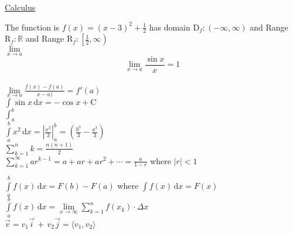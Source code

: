 \documentclass[11pt, letterpaper]{article}
\author{Anish Sachdeva}
\begin{document}
\begin{center}
\underline{Calculus}
\end{center}
The function is $f(x) = (x-3)^2 + \frac{1}{2}$ has domain 
$\mathrm{D}_f : (-\infty, \infty)$ 
and Range $\mathrm{R}_f : \mathbb{R}$
and Range $\mathrm{R}_f : \left[\frac{1}{2}, \infty\right)$\\

$\lim \limits_{x \rightarrow a}$\\

$$\lim \limits_{x \to a} \frac{\sin{x}}{x} = 1$$\\

$\lim \limits_{x \to 	a} \displaystyle{\frac{f(x) - f(a)}{x - a)}} = f'(a)$\\
$\displaystyle{
\int \sin{x}\,\mathrm{d}x = -\cos{x} + \mathrm{C}
}$\\

$\displaystyle{
\int_a^b
}$\\

$\displaystyle{
\int \limits_a^b x^2 \, \mathrm{d}x = \left|\frac{x^3}{3}\right|_a^b = \left(\frac{b^3}{3} - \frac{a^3}{3}\right)
}$\\

$\displaystyle{
\sum_{k=1}^n k = \frac{n(n+1)}{2}}$\\

$\displaystyle{
\sum_{k=1}^{\infty} ar^{k-1} = a + ar + ar^2 + \cdots = \frac{a}{1-r} }$ where $|r| < 1$

$\displaystyle{
\int \limits_a^b f(x) \, \mathrm{d}x = F(b) - F(a)
}$ where 
$\displaystyle{
\int f(x) \, \mathrm{d}x= F(x)
}$\\

$\displaystyle{
\int \limits_a^b f(x) \, \mathrm{d}x = \lim \limits_{x \to \infty}\sum_{k=1}^n f(x_k) \cdot \Delta x
}$\\

$\displaystyle{
\vec{v} = v_1 \vec{i} \, + \, v_2 \vec{j} = \langle v_1, v_2 \rangle}$
\end{document}

